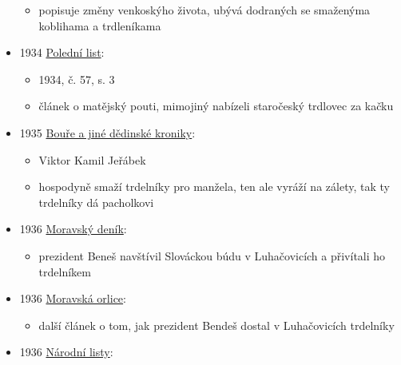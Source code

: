 \begin{itemize}
  \begin{itemize}
  \tightlist
  \item
    popisuje změny venkoskýho života, ubývá dodraných se smaženýma
    koblihama a trdleníkama
  \end{itemize}
\item
  1934
  \href{https://ceskadigitalniknihovna.cz/view/uuid:c1ecf480-9c2d-11e3-8b69-005056825209?page=uuid\%3Ac53ff231-d798-11e3-94ef-5ef3fc9ae867&fulltext=trdlovec&source=nkp}{Polední
  list}:

  \begin{itemize}
  \tightlist
  \item
    1934, č. 57, s. 3
  \item
    článek o matějský pouti, mimojiný nabízeli staročeský trdlovec za
    kačku
  \end{itemize}
\item
  1935
  \href{https://ceskadigitalniknihovna.cz/view/uuid:9e3e00c0-1eb9-11ed-bb16-005056827e52?page=uuid\%3Ac70b483f-d1ae-48f7-9b87-ec788605bd6c&fulltext=trdeln*&source=mzk}{Bouře
  a jiné dědinské kroniky}:

  \begin{itemize}
  \tightlist
  \item
    Viktor Kamil Jeřábek
  \item
    hospodyně smaží trdelníky pro manžela, ten ale vyráží na zálety, tak
    ty trdelníky dá pacholkovi
  \end{itemize}
\item
  1936
  \href{https://ceskadigitalniknihovna.cz/view/uuid:21c28337-816c-4103-a6ae-143ab29b452a?page=uuid\%3A138254c0-7d8d-11e9-b171-5ef3fc9ae867&fulltext=trdeln\%C3\%ADk\%20OR\%20trdeln\%C3\%ADky\%20OR\%20trdeln\%C3\%ADk\%C5\%AF&source=nkp}{Moravský
  deník}:

  \begin{itemize}
  \tightlist
  \item
    prezident Beneš navštívil Slováckou búdu v Luhačovicích a přivítali
    ho trdelníkem
  \end{itemize}
\item
  1936
  \href{https://ceskadigitalniknihovna.cz/view/uuid:5e938270-0675-11df-93e5-000d606f5dc6?page=uuid:37544fe0-fb63-11de-ba13-000d606f5dc6&fulltext=trdeln\%C3\%AD*&source=mzk}{Moravská
  orlice}:

  \begin{itemize}
  \tightlist
  \item
    další článek o tom, jak prezident Bendeš dostal v Luhačovicích
    trdelníky
  \end{itemize}
\item
  1936
  \href{https://ceskadigitalniknihovna.cz/view/uuid:f2e890b0-435d-11dd-b505-00145e5790ea?page=uuid\%3A6d16d5b9-435f-11dd-b505-00145e5790ea&fulltext=trdeln\%C3\%ADk\%20OR\%20trdeln\%C3\%ADky\%20OR\%20trdeln\%C3\%ADk\%C5\%AF&source=svkhk}{Národní
  listy}:


\end{itemize}
